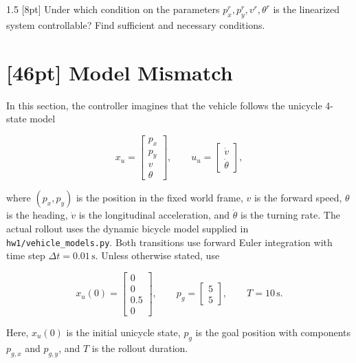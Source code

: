 \solution{}


{1.5 [8pt] Under which condition on the parameters $p_x^r, p_y^r, v^r, \theta^r$ is the linearized system controllable? Find sufficient and necessary conditions.}

\solution{}



\section{[46pt] Model Mismatch}

In this section, the controller imagines that the vehicle follows the unicycle
4-state model

\begin{equation}
x_u=
\begin{bmatrix}p_x\\p_y\\v\\\theta\end{bmatrix},
\qquad
u_u=
\begin{bmatrix}\dot v\\\dot\theta\end{bmatrix},
\end{equation}

where $(p_x,p_y)$ is the position in the fixed world frame, $v$ is the forward
speed, $\theta$ is the heading, $\dot v$ is the longitudinal acceleration, and
$\dot\theta$ is the turning rate. The actual rollout uses the dynamic bicycle
model supplied in \texttt{hw1/vehicle\_models.py}. Both transitions use forward
Euler integration with time step $\Delta t=0.01\,\mathrm{s}$. Unless otherwise
stated, use

\begin{equation}
x_u(0)=
\begin{bmatrix}0\\0\\0.5\\0\end{bmatrix},
\qquad
p_g=
\begin{bmatrix}5\\5\end{bmatrix},
\qquad
T=10\,\mathrm{s}.
\end{equation}

Here, $x_u(0)$ is the initial unicycle state, $p_g$ is the goal position with
components $p_{g,x}$ and $p_{g,y}$, and $T$ is the rollout duration.

